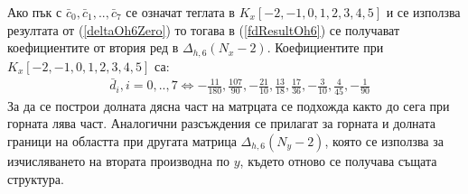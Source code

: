 \documentclass{article}
\newcommand{\rf}[1]{(\ref{#1})}
\begin{document}
Ако пък с $\bar c_0, \bar c_1, .., \bar c_7$ се означат теглата в $K_x[-2,-1,0,1,2,3,4,5]$ и се използва резултата от \rf{deltaOh6Zero} то тогава в \rf{fdResultOh6} се получават коефициентите от втория ред в  $\Delta_{h,6}(N_x-2)$. Коефициентите при $K_x[-2,-1,0,1,2,3,4,5]$ са:
\begin{align}
&\bar d_i, i = 0,..,7 \iff -\frac{11}{180}, \frac{107}{90}, -\frac{21}{10}, \frac{13}{18}, \frac{17}{36}, -\frac{3}{10}, \frac{4}{45}, -\frac{1}{90}
\end{align}
За да се построи долната дясна част на матрцата се подхожда както до сега при горната лява част. Аналогични разсъждения се прилагат за горната и долната граници на областта при другата матрица $\Delta_{h,6}(N_y-2)$, която се използва за изчисляването на втората производна по $y$, където отново се получава същата структура.
\end{document}
